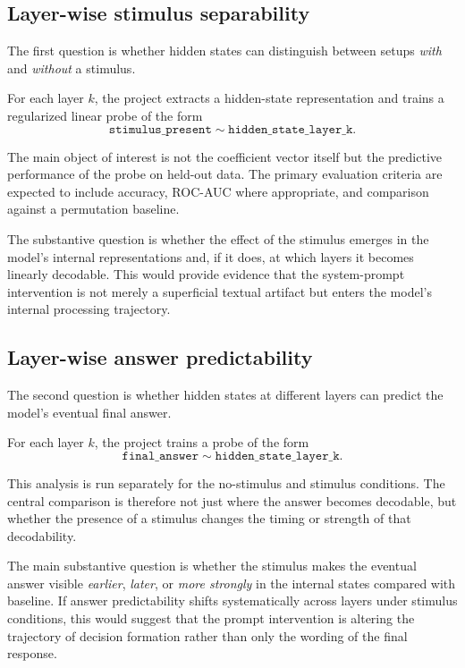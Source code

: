 \documentclass[14pt,a4paper]{extarticle}
\begin{document}
\subsection{Layer-wise stimulus separability}

The first question is whether hidden states can distinguish between setups \emph{with} and \emph{without} a stimulus.

For each layer $k$, the project extracts a hidden-state representation and trains a regularized linear probe of the form
\[
\texttt{stimulus\_present} \sim \texttt{hidden\_state\_layer\_k}.
\]

The main object of interest is not the coefficient vector itself but the predictive performance of the probe on held-out data. The primary evaluation criteria are expected to include accuracy, ROC-AUC where appropriate, and comparison against a permutation baseline.

The substantive question is whether the effect of the stimulus emerges in the model's internal representations and, if it does, at which layers it becomes linearly decodable. This would provide evidence that the system-prompt intervention is not merely a superficial textual artifact but enters the model's internal processing trajectory.

\subsection{Layer-wise answer predictability}

The second question is whether hidden states at different layers can predict the model's eventual final answer.

For each layer $k$, the project trains a probe of the form
\[
\texttt{final\_answer} \sim \texttt{hidden\_state\_layer\_k}.
\]

This analysis is run separately for the no-stimulus and stimulus conditions. The central comparison is therefore not just where the answer becomes decodable, but whether the presence of a stimulus changes the timing or strength of that decodability.

The main substantive question is whether the stimulus makes the eventual answer visible \emph{earlier}, \emph{later}, or \emph{more strongly} in the internal states compared with baseline. If answer predictability shifts systematically across layers under stimulus conditions, this would suggest that the prompt intervention is altering the trajectory of decision formation rather than only the wording of the final response.
\end{document}

